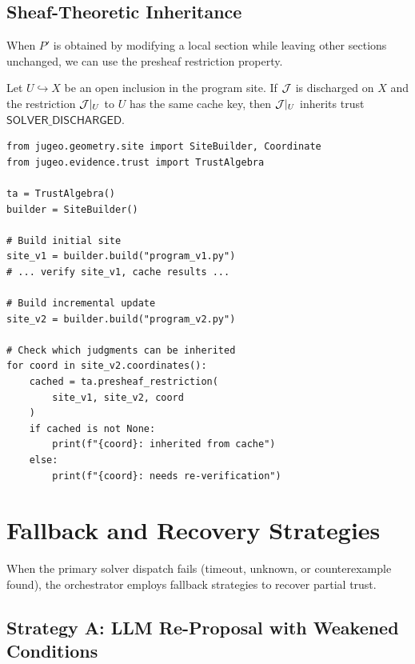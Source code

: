 \documentclass[11pt]{article}
\newcommand{\SolverDisch}{\ensuremath{\mathsf{SOLVER\_DISCHARGED}}}
\begin{document}
\subsection{Sheaf-Theoretic Inheritance}

When $P'$ is obtained by modifying a local section while leaving
other sections unchanged, we can use the presheaf restriction
property.

\begin{lemma}\label{lem:restriction-inherit}
Let $U \hookrightarrow X$ be an open inclusion in the program site.
If $\mathcal{J}$ is discharged on $X$ and the restriction $\mathcal{J}|_U$ to $U$ has
the same cache key, then $\mathcal{J}|_U$ inherits trust $\SolverDisch$.
\end{lemma}

\begin{lstlisting}[style=jugeo-python]
from jugeo.geometry.site import SiteBuilder, Coordinate
from jugeo.evidence.trust import TrustAlgebra

ta = TrustAlgebra()
builder = SiteBuilder()

# Build initial site
site_v1 = builder.build("program_v1.py")
# ... verify site_v1, cache results ...

# Build incremental update
site_v2 = builder.build("program_v2.py")

# Check which judgments can be inherited
for coord in site_v2.coordinates():
    cached = ta.presheaf_restriction(
        site_v1, site_v2, coord
    )
    if cached is not None:
        print(f"{coord}: inherited from cache")
    else:
        print(f"{coord}: needs re-verification")
\end{lstlisting}

\section{Fallback and Recovery Strategies}\label{sec:fallback}

When the primary solver dispatch fails (timeout, unknown, or
counterexample found), the orchestrator employs fallback strategies
to recover partial trust.

\subsection{Strategy A: LLM Re-Proposal with Weakened Conditions}
\end{document}
